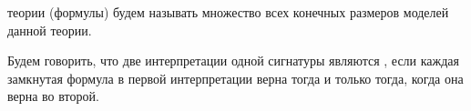 

\setcounter{curtask}{21}




\begin{definition*}
     теории (формулы) будем называть множество всех конечных размеров моделей данной
    теории.
\end{definition*}


\begin{definition*}
    Будем говорить, что две интерпретации одной сигнатуры являются ,
    если каждая замкнутая формула в первой интерпретации верна тогда и только тогда, когда она верна во
    второй.
\end{definition*}


\breakline






